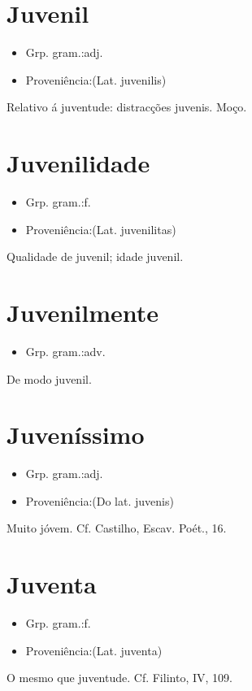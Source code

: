 \documentclass{article}
\begin{document}
\section{Juvenil}
\begin{itemize}
\item {Grp. gram.:adj.}
\end{itemize}
\begin{itemize}
\item {Proveniência:(Lat. \textunderscore juvenilis\textunderscore )}
\end{itemize}
Relativo á juventude: \textunderscore distracções juvenis\textunderscore .
Moço.
\section{Juvenilidade}
\begin{itemize}
\item {Grp. gram.:f.}
\end{itemize}
\begin{itemize}
\item {Proveniência:(Lat. \textunderscore juvenilitas\textunderscore )}
\end{itemize}
Qualidade de juvenil; idade juvenil.
\section{Juvenilmente}
\begin{itemize}
\item {Grp. gram.:adv.}
\end{itemize}
De modo juvenil.
\section{Juveníssimo}
\begin{itemize}
\item {Grp. gram.:adj.}
\end{itemize}
\begin{itemize}
\item {Proveniência:(Do lat. \textunderscore juvenis\textunderscore )}
\end{itemize}
Muito jóvem. Cf. Castilho, \textunderscore Escav. Poét.\textunderscore , 16.
\section{Juventa}
\begin{itemize}
\item {Grp. gram.:f.}
\end{itemize}
\begin{itemize}
\item {Proveniência:(Lat. \textunderscore juventa\textunderscore )}
\end{itemize}
O mesmo que \textunderscore juventude\textunderscore . Cf. Filinto, IV, 109.
\end{document}

